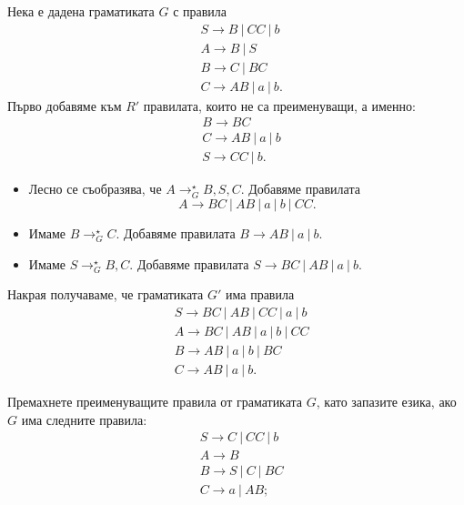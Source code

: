 \begin{example}
  Нека е дадена граматиката $G$ с правила  
  \begin{align*}
    & S \to B\ |\ CC\ |\ b\\
    & A \to B\ |\ S\\
    & B \to C\ |\ BC\\
    & C \to AB\ |\ a\ |\ b.
  \end{align*}
  Първо добавяме към $R'$ правилата, които не са преименуващи, а именно:
  \begin{align*}
    & B \to BC\\
    & C \to AB\ |\ a\ |\ b\\
    & S \to CC\ |\ b.
  \end{align*}
  \begin{itemize}
  \item 
    Лесно се съобразява, че $A \to^\star_G B,S,C$.
    Добавяме правилата 
    \[A \to BC\ |\ AB\ |\ a\ |\ b\ |\ CC.\]
  \item
    Имаме $B \to^\star_G C$.
    Добавяме правилата $B \to AB\ |\ a\ |\ b$.
  \item
    Имаме $S \to^\star_G B,C$.
    Добавяме правилата $S \to BC\ |\ AB\ |\ a\ |\ b$.
  \end{itemize}
  Накрая получаваме, че граматиката $G'$ има правила
  \begin{align*}
    & S \to BC\ |\ AB\ |\ CC\ |\ a\ |\ b\\
    & A \to BC\ |\ AB\ |\ a\ |\ b\ |\ CC\\
    & B \to AB\ |\ a\ |\ b\ |\ BC\\
    & C \to AB\ |\ a\ |\ b.
  \end{align*}
\end{example}

\begin{problem}
  Премахнете преименуващите правила от граматиката $G$, като запазите езика, ако $G$ има следните правила:
    \begin{align*}
      & S \to C\ |\ CC\ |\ b\\
      & A \to B\\
      & B \to S\ |\ C\ |\ BC\\
      & C \to a\ |\ AB;
    \end{align*}
\end{problem}

